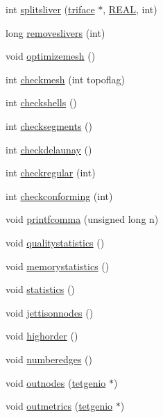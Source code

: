 \begin{DoxyCompactItemize}
\item 
int \hyperlink{classtetgenmesh_aa9540f310c97db99c989a02b0978ceec}{splitsliver} (\hyperlink{classtetgenmesh_1_1triface}{triface} $\ast$, \hyperlink{tetgen_8h_a4b654506f18b8bfd61ad2a29a7e38c25}{R\-E\-A\-L}, int)
\item 
long \hyperlink{classtetgenmesh_ad5c46c2f6c9adeed23fc8c64b682778d}{removeslivers} (int)
\item 
void \hyperlink{classtetgenmesh_a8bb5c6ad8ccfa57f2a84e5a78295b263}{optimizemesh} ()
\item 
int \hyperlink{classtetgenmesh_ad651dfc786ffccea226a0bf786f94222}{checkmesh} (int topoflag)
\item 
int \hyperlink{classtetgenmesh_a1db73573a8d3fdfe9da17556b6aacad4}{checkshells} ()
\item 
int \hyperlink{classtetgenmesh_ae2cbec9eb2c18f23e2046780841c9f6a}{checksegments} ()
\item 
int \hyperlink{classtetgenmesh_aa49e45f69ca54da5e57339bb72346a76}{checkdelaunay} ()
\item 
int \hyperlink{classtetgenmesh_a4acb9c2400d8d496b0e546f59eb0e9a8}{checkregular} (int)
\item 
int \hyperlink{classtetgenmesh_aa7ff4d59b68391bc6eb4998017a43b77}{checkconforming} (int)
\item 
void \hyperlink{classtetgenmesh_ae37cd75094463b36d4f1051e7312ca00}{printfcomma} (unsigned long n)
\item 
void \hyperlink{classtetgenmesh_a472328a6a8fe8076ed0443e3b2cab4c1}{qualitystatistics} ()
\item 
void \hyperlink{classtetgenmesh_a0210508dcc8f64449ed5ffe957a45fd2}{memorystatistics} ()
\item 
void \hyperlink{classtetgenmesh_a2e85077125aa1c4d2dcd0c8e58eac9a0}{statistics} ()
\item 
void \hyperlink{classtetgenmesh_a2ceb55fb1e757b0083a41ad34aabab56}{jettisonnodes} ()
\item 
void \hyperlink{classtetgenmesh_a2442f784a429111586a323a185009e68}{highorder} ()
\item 
void \hyperlink{classtetgenmesh_a1dd758a62fcc10e6aba7ddbacf188270}{numberedges} ()
\item 
void \hyperlink{classtetgenmesh_a7822fa38f096959d128175922aa57460}{outnodes} (\hyperlink{classtetgenio}{tetgenio} $\ast$)
\item 
void \hyperlink{classtetgenmesh_a7f7239417b0e75bb293eaba2f2ff4ff8}{outmetrics} (\hyperlink{classtetgenio}{tetgenio} $\ast$)
\item 

\end{DoxyCompactItemize}
